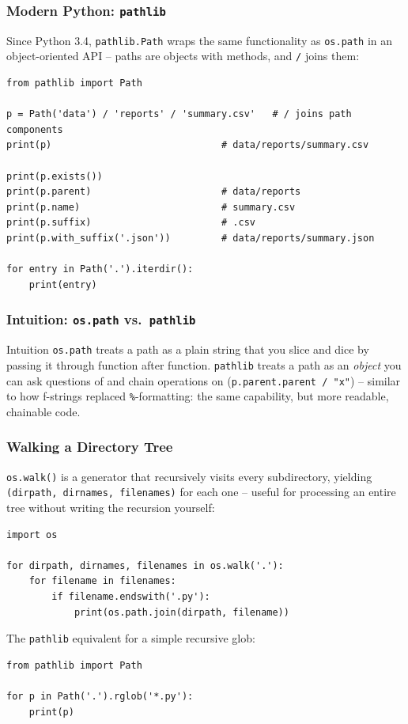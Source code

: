 \begin{frame}[fragile]\frametitle{Modern Python: \texttt{pathlib}}
Since Python 3.4, \texttt{pathlib.Path} wraps the same functionality as \texttt{os.path} in an
object-oriented API -- paths are objects with methods, and \texttt{/} joins them:
\begin{lstlisting}
from pathlib import Path

p = Path('data') / 'reports' / 'summary.csv'   # / joins path components
print(p)                              # data/reports/summary.csv

print(p.exists())
print(p.parent)                       # data/reports
print(p.name)                         # summary.csv
print(p.suffix)                       # .csv
print(p.with_suffix('.json'))         # data/reports/summary.json

for entry in Path('.').iterdir():
    print(entry)
\end{lstlisting}
\end{frame}

\begin{frame}[fragile]\frametitle{Intuition: \texttt{os.path} vs.\ \texttt{pathlib}}
\begin{block}{Intuition}
\texttt{os.path} treats a path as a plain string that you slice and dice by passing it through
function after function. \texttt{pathlib} treats a path as an \emph{object} you can ask
questions of and chain operations on (\texttt{p.parent.parent / "x"}) -- similar to how
f-strings replaced \texttt{\%}-formatting: the same capability, but more readable, chainable
code.
\end{block}
\end{frame}

\begin{frame}[fragile]\frametitle{Walking a Directory Tree}
\lstinline|os.walk()| is a generator that recursively visits every subdirectory, yielding
\texttt{(dirpath, dirnames, filenames)} for each one -- useful for processing an entire tree
without writing the recursion yourself:
\begin{lstlisting}
import os

for dirpath, dirnames, filenames in os.walk('.'):
    for filename in filenames:
        if filename.endswith('.py'):
            print(os.path.join(dirpath, filename))
\end{lstlisting}
The \texttt{pathlib} equivalent for a simple recursive glob:
\begin{lstlisting}
from pathlib import Path

for p in Path('.').rglob('*.py'):
    print(p)
\end{lstlisting}
\end{frame}

